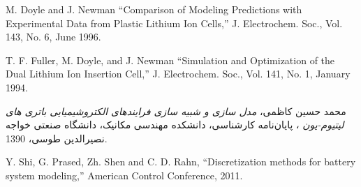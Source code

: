  \begin{thebibliography}{99}

\begin{LTRitems}
\resetlatinfont
{}
M.  Doyle  and J.  Newman ``Comparison of Modeling Predictions with Experimental Data from Plastic Lithium Ion Cells,''  J. Electrochem. Soc., Vol. 143, No. 6, June 1996.


T. F. Fuller, M.  Doyle, and J.  Newman ``Simulation and Optimization of the Dual Lithium Ion Insertion Cell,''  J. Electrochem. Soc., Vol. 141, No. 1, January 1994.

\end{LTRitems}

محمد حسین کاظمی، \textit{مدل سازی و شبیه سازی فرایندهای الکتروشیمیایی باتری های لیتیوم-یون} ، پایان‌نامه کارشناسی، 
دانشکده مهندسی مکانیک، دانشگاه صنعتی خواجه نصیرالدین طوسی، 1390.

\begin{LTRitems}
\resetlatinfont

Y.  Shi, G.  Prased, Zh. Shen and C. D. Rahn, ``Discretization methods for battery system modeling,'' American Control Conference, 2011.
\end{LTRitems}

\end{thebibliography}
 

